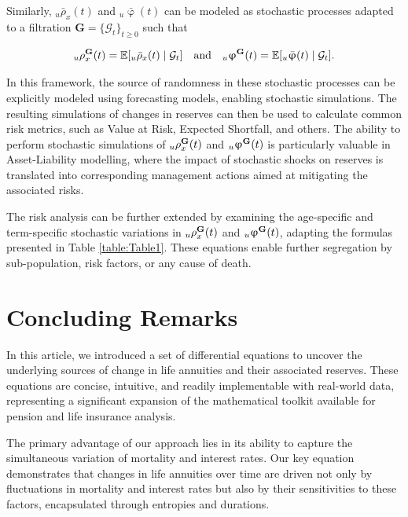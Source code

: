 \documentclass[12pt]{article}
\begin{document}
Similarly, \( {}_u\bar{\rho}_x(t) \) and \( {}_u\bar{\upvarphi}(t) \) can be modeled as stochastic processes adapted to a filtration \( \textbf{G} = \{\mathcal{G}_t\}_{t \ge 0} \) such that 

\[
{}_u{\rho}^{\bf{G}}_x(t) = \mathbb{E}[{}_u\bar{\rho}_x(t) \mid \mathcal{G}_t] \quad \text{and} \quad {}_u{\upvarphi}^{\bf{G}}(t) = \mathbb{E}[{}_u\bar{\upvarphi}(t) \mid \mathcal{G}_t].
\]

In this framework, the source of randomness in these stochastic processes can be explicitly modeled using forecasting models, enabling stochastic simulations. The resulting simulations of changes in reserves can then be used to calculate common risk metrics, such as Value at Risk, Expected Shortfall, and others. The ability to perform stochastic simulations of \( {}_u{\rho}^{\bf{G}}_x(t) \) and \( {}_u{\upvarphi}^{\bf{G}}(t) \) is particularly valuable in Asset-Liability modelling, where the impact of stochastic shocks on reserves is translated into corresponding management actions aimed at mitigating the associated risks.

The risk analysis can be further extended by examining the age-specific and term-specific stochastic variations in \( {}_u{\rho}^{\bf{G}}_x(t) \) and \( {}_u{\upvarphi}^{\bf{G}}(t) \), adapting the formulas presented in Table \ref{table:Table1}. These equations enable further segregation by sub-population, risk factors, or any cause of death.



\section{Concluding Remarks}\label{sec:6_Conclusion}

In this article, we introduced a set of differential equations to uncover the underlying sources of change in life annuities and their associated reserves. These equations are concise, intuitive, and readily implementable with real-world data, representing a significant expansion of the mathematical toolkit available for pension and life insurance analysis.

The primary advantage of our approach lies in its ability to capture the simultaneous variation of mortality and interest rates. Our key equation demonstrates that changes in life annuities over time are driven not only by fluctuations in mortality and interest rates but also by their sensitivities to these factors, encapsulated through entropies and durations.
\end{document}
